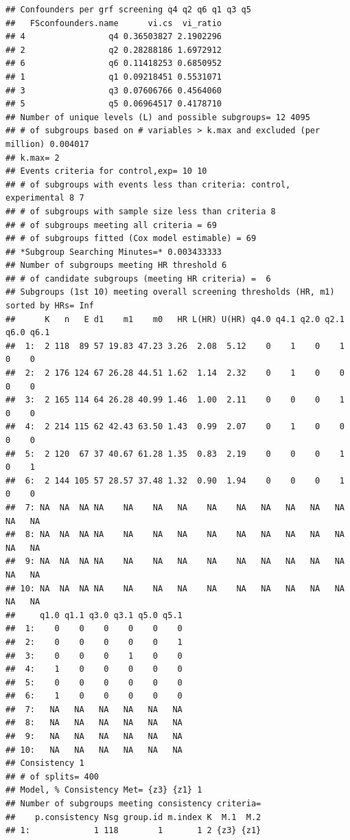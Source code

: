\documentclass[smallextended]{svjour3}
\makeatletter
\newenvironment{kframe}{%
 \def\at@end@of@kframe{}%
 \ifinner\ifhmode%
  \def\at@end@of@kframe{\end{minipage}}%
  \begin{minipage}{\columnwidth}%
 \fi\fi%
 \def\FrameCommand##1{\hskip\@totalleftmargin \hskip-\fboxsep
 \colorbox{shadecolor}{##1}\hskip-\fboxsep
     \hskip-\linewidth \hskip-\@totalleftmargin \hskip\columnwidth}%
 \MakeFramed {\advance\hsize-\width
   \@totalleftmargin\z@ \linewidth\hsize
   \@setminipage}}%
 {\par\unskip\endMakeFramed%
 \at@end@of@kframe}
\newenvironment{knitrout}{}{} %
\makeatother
\begin{document}
\begin{knitrout}
\begin{kframe}
\begin{verbatim}
## Confounders per grf screening q4 q2 q6 q1 q3 q5 
##   FSconfounders.name      vi.cs  vi_ratio
## 4                 q4 0.36503827 2.1902296
## 2                 q2 0.28288186 1.6972912
## 6                 q6 0.11418253 0.6850952
## 1                 q1 0.09218451 0.5531071
## 3                 q3 0.07606766 0.4564060
## 5                 q5 0.06964517 0.4178710
## Number of unique levels (L) and possible subgroups= 12 4095 
## # of subgroups based on # variables > k.max and excluded (per million) 0.004017 
## k.max= 2 
## Events criteria for control,exp= 10 10 
## # of subgroups with events less than criteria: control, experimental 8 7 
## # of subgroups with sample size less than criteria 8 
## # of subgroups meeting all criteria = 69 
## # of subgroups fitted (Cox model estimable) = 69 
## *Subgroup Searching Minutes=* 0.003433333 
## Number of subgroups meeting HR threshold 6 
## # of candidate subgroups (meeting HR criteria) =  6 
## Subgroups (1st 10) meeting overall screening thresholds (HR, m1) sorted by HRs= Inf 
##      K   n   E d1    m1    m0   HR L(HR) U(HR) q4.0 q4.1 q2.0 q2.1 q6.0 q6.1
##  1:  2 118  89 57 19.83 47.23 3.26  2.08  5.12    0    1    0    1    0    0
##  2:  2 176 124 67 26.28 44.51 1.62  1.14  2.32    0    1    0    0    0    0
##  3:  2 165 114 64 26.28 40.99 1.46  1.00  2.11    0    0    0    1    0    0
##  4:  2 214 115 62 42.43 63.50 1.43  0.99  2.07    0    1    0    0    0    0
##  5:  2 120  67 37 40.67 61.28 1.35  0.83  2.19    0    0    0    1    0    1
##  6:  2 144 105 57 28.57 37.48 1.32  0.90  1.94    0    0    0    1    0    0
##  7: NA  NA  NA NA    NA    NA   NA    NA    NA   NA   NA   NA   NA   NA   NA
##  8: NA  NA  NA NA    NA    NA   NA    NA    NA   NA   NA   NA   NA   NA   NA
##  9: NA  NA  NA NA    NA    NA   NA    NA    NA   NA   NA   NA   NA   NA   NA
## 10: NA  NA  NA NA    NA    NA   NA    NA    NA   NA   NA   NA   NA   NA   NA
##     q1.0 q1.1 q3.0 q3.1 q5.0 q5.1
##  1:    0    0    0    0    0    0
##  2:    0    0    0    0    0    1
##  3:    0    0    0    1    0    0
##  4:    1    0    0    0    0    0
##  5:    0    0    0    0    0    0
##  6:    1    0    0    0    0    0
##  7:   NA   NA   NA   NA   NA   NA
##  8:   NA   NA   NA   NA   NA   NA
##  9:   NA   NA   NA   NA   NA   NA
## 10:   NA   NA   NA   NA   NA   NA
## Consistency 1 
## # of splits= 400 
## Model, % Consistency Met= {z3} {z1} 1 
## Number of subgroups meeting consistency criteria= 
##    p.consistency Nsg group.id m.index K  M.1  M.2
## 1:             1 118        1       1 2 {z3} {z1}
\end{verbatim}

\end{kframe}
\end{knitrout}
\end{document}
